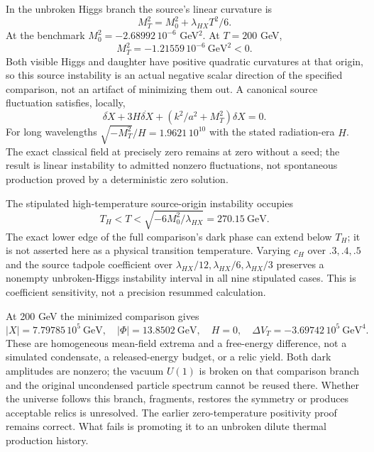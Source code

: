 \documentclass[11pt]{article}
\newcommand{\lp}{\lambda_{HX}}
\begin{document}
In the unbroken Higgs branch the source's linear curvature is
\begin{equation}
 M_T^2=M_0^2+\lp T^2/6.
\end{equation}
At the benchmark $M_0^2=-2.68992\,10^{-6}$ GeV$^2$. At $T=200$ GeV,
\begin{equation}
 M_T^2=-1.21559\,10^{-6}\ \mathrm{GeV}^2<0.
\end{equation}
Both visible Higgs and daughter have positive quadratic curvatures at that
origin, so this source instability is an actual negative scalar direction
of the specified comparison, not an artifact of minimizing them out.
A canonical source fluctuation satisfies, locally,
\begin{equation}
 \ddot{\delta X}+3H\dot{\delta X}
 +(k^2/a^2+M_T^2)\delta X=0.
\end{equation}
For long wavelengths $\sqrt{-M_T^2}/H=1.9621\,10^{10}$ with the stated
radiation-era $H$. The exact classical field at precisely zero remains at
zero without a seed; the result is linear instability to admitted nonzero
fluctuations, not spontaneous production proved by a deterministic zero solution.

The stipulated high-temperature source-origin instability occupies
\begin{equation}
 T_H<T<\sqrt{-6M_0^2/\lp}=270.15\ \mathrm{GeV}.
\end{equation}
The exact lower edge of the full comparison's dark phase can extend below
$T_H$; it is not asserted here as a physical transition temperature.
Varying $c_H$ over $.3,.4,.5$ and the source tadpole coefficient over
$\lp/12,\lp/6,\lp/3$ preserves a nonempty unbroken-Higgs instability
interval in all nine stipulated cases. This is coefficient sensitivity,
not a precision resummed calculation.

At 200 GeV the minimized comparison gives
\begin{equation}
 |X|=7.79785\,10^5\ \mathrm{GeV},\quad
 |\Phi|=13.8502\ \mathrm{GeV},\quad H=0,\quad
 \Delta V_T=-3.69742\,10^5\ \mathrm{GeV}^4.
\end{equation}
These are homogeneous mean-field extrema and a free-energy difference,
not a simulated condensate, a released-energy budget, or a relic yield.
Both dark amplitudes are nonzero; the vacuum $U(1)$ is broken on that
comparison branch and the original uncondensed particle spectrum cannot
be reused there. Whether the universe follows this branch, fragments,
restores the symmetry or produces acceptable relics is unresolved.
The earlier zero-temperature positivity proof remains correct. What fails
is promoting it to an unbroken dilute thermal production history.
\end{document}
